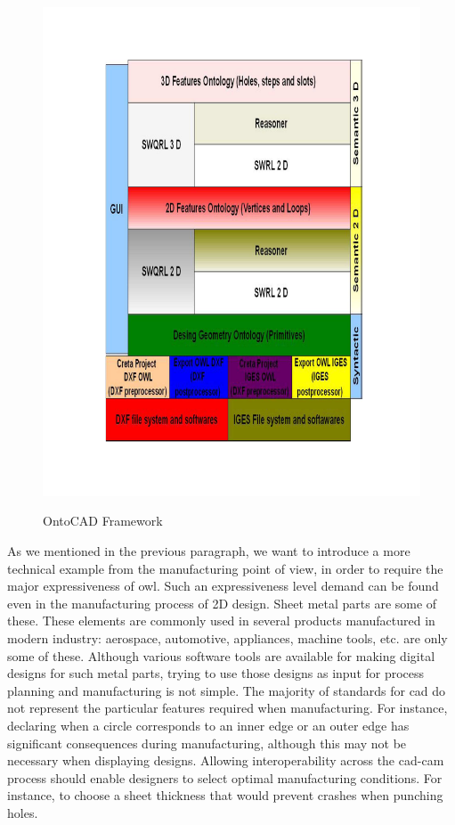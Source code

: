 \begin{figure}
\begin{center}
	\includegraphics[scale=0.8]{figure-chapterIV/fig4-33}\\
	\vspace{-20mm}
	\caption{OntoCAD Framework}
	\label{figure4-33}
\end{center}
\end{figure}

As we mentioned in the previous paragraph, we want to introduce a more technical example from the manufacturing point of view, in order to require the major expressiveness of \gls{owl}. Such an expressiveness level demand can be found even in the manufacturing process of 2D design. Sheet   metal parts are some of these. These elements are commonly used in several products manufactured in modern industry: aerospace, automotive, appliances, machine tools, etc. are only some of these. Although various software tools are available for making digital designs for such metal parts, trying to use those designs as input for process planning and manufacturing is not simple.  The majority of standards for \gls{cad} do not represent the particular features required when manufacturing. For instance, declaring when a circle corresponds to an inner edge or an outer edge has significant consequences during manufacturing, although this may not be necessary when displaying designs. Allowing interoperability across the \gls{cad}-\gls{cam} process should enable designers to select optimal manufacturing conditions. For instance, to choose a sheet thickness that would prevent crashes when punching holes.


